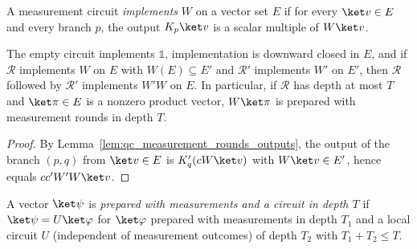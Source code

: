 \begin{definition}
    \label{def:qc_round_implementation}
    \leanok
    A measurement circuit \emph{implements} $W$ on a vector set $E$ if for every $\ket v\in E$ and every branch $p$, the output $K_p\ket v$ is a scalar multiple of $W\ket v$.
\end{definition}

\begin{lemma}
    \label{lem:qc_round_implementation_compose}
    \leanok
    The empty circuit implements $\mathbb 1$, implementation is downward closed in $E$, and if $\mathcal R$ implements $W$ on $E$ with $W(E)\subseteq E'$ and $\mathcal R'$ implements $W'$ on $E'$, then $\mathcal R$ followed by $\mathcal R'$ implements $W'W$ on $E$. In particular, if $\mathcal R$ has depth at most $T$ and $\ket\pi\in E$ is a nonzero product vector, $W\ket\pi$ is prepared with measurement rounds in depth $T$.
\end{lemma}
\begin{proof}
    \leanok
    By Lemma~\ref{lem:qc_measurement_rounds_outputs}, the output of the branch $(p,q)$ from $\ket v\in E$ is $K'_q(cW\ket v)$ with $W\ket v\in E'$, hence equals $cc'W'W\ket v$.
\end{proof}

\begin{definition}
    \label{def:qc_measurement_circuit_preparation}
    \leanok
    A vector $\ket\psi$ is \emph{prepared with measurements and a circuit in depth $T$} if $\ket\psi=U\ket\varphi$ for $\ket\varphi$ prepared with measurements in depth $T_1$ and a local circuit $U$ (independent of measurement outcomes) of depth $T_2$ with $T_1+T_2\leq T$.
\end{definition}


